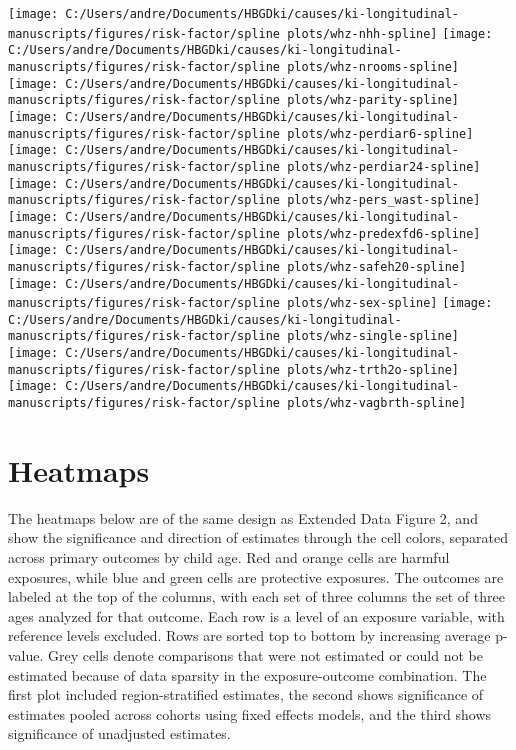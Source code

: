 \documentclass[9pt,]{book}
\begin{document}
\texttt{[image: C:/Users/andre/Documents/HBGDki/causes/ki-longitudinal-manuscripts/figures/risk-factor/spline plots/whz-nhh-spline]}
\texttt{[image: C:/Users/andre/Documents/HBGDki/causes/ki-longitudinal-manuscripts/figures/risk-factor/spline plots/whz-nrooms-spline]}
\texttt{[image: C:/Users/andre/Documents/HBGDki/causes/ki-longitudinal-manuscripts/figures/risk-factor/spline plots/whz-parity-spline]}
\texttt{[image: C:/Users/andre/Documents/HBGDki/causes/ki-longitudinal-manuscripts/figures/risk-factor/spline plots/whz-perdiar6-spline]}
\texttt{[image: C:/Users/andre/Documents/HBGDki/causes/ki-longitudinal-manuscripts/figures/risk-factor/spline plots/whz-perdiar24-spline]}
\texttt{[image: C:/Users/andre/Documents/HBGDki/causes/ki-longitudinal-manuscripts/figures/risk-factor/spline plots/whz-pers\_wast-spline]}
\texttt{[image: C:/Users/andre/Documents/HBGDki/causes/ki-longitudinal-manuscripts/figures/risk-factor/spline plots/whz-predexfd6-spline]}
\texttt{[image: C:/Users/andre/Documents/HBGDki/causes/ki-longitudinal-manuscripts/figures/risk-factor/spline plots/whz-safeh20-spline]}
\texttt{[image: C:/Users/andre/Documents/HBGDki/causes/ki-longitudinal-manuscripts/figures/risk-factor/spline plots/whz-sex-spline]}
\texttt{[image: C:/Users/andre/Documents/HBGDki/causes/ki-longitudinal-manuscripts/figures/risk-factor/spline plots/whz-single-spline]}
\texttt{[image: C:/Users/andre/Documents/HBGDki/causes/ki-longitudinal-manuscripts/figures/risk-factor/spline plots/whz-trth2o-spline]}
\texttt{[image: C:/Users/andre/Documents/HBGDki/causes/ki-longitudinal-manuscripts/figures/risk-factor/spline plots/whz-vagbrth-spline]}

\chapter{Heatmaps}\label{heatmaps}

\raggedright

The heatmaps below are of the same design as Extended Data Figure 2, and
show the significance and direction of estimates through the cell
colors, separated across primary outcomes by child age. Red and orange
cells are harmful exposures, while blue and green cells are protective
exposures. The outcomes are labeled at the top of the columns, with each
set of three columns the set of three ages analyzed for that outcome.
Each row is a level of an exposure variable, with reference levels
excluded. Rows are sorted top to bottom by increasing average p-value.
Grey cells denote comparisons that were not estimated or could not be
estimated because of data sparsity in the exposure-outcome combination.
The first plot included region-stratified estimates, the second shows
significance of estimates pooled across cohorts using fixed effects
models, and the third shows significance of unadjusted estimates.
\end{document}
